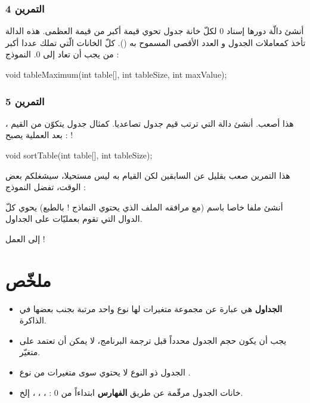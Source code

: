 \subsubsection{التمرين 4}
أنشئ دالّة
دورها إسناد 0 لكلّ خانة جدول تحوي قيمة أكبر من قيمة العظمى. هذه الدالة تأخذ كمعاملات الجدول و العدد الأقصى المسموح به
().
كلّ الخانات الّتي تملك عددا أكبر من
يجب أن تعاد إلى 0. النموذج :
\begin{Csource}
void tableMaximum(int table[], int tableSize, int maxValue);
\end{Csource}
\subsubsection{التمرين 5}
هذا أصعب. أنشئ دالة
التي ترتب قيم جدول تصاعديا. كمثال جدول يتكوّن من القيم
،
بعد العملية يصبح :
 !
\begin{Csource}
void sortTable(int table[], int tableSize);
\end{Csource}
هذا التمرين صعب بقليل عن السابقين لكن القيام به ليس مستحيلا، سيشغلكم بعض الوقت، تفضل النموذج :
\begin{information}
أنشئ ملفا خاصا باسم
(مع مرافقه الملف
الذي يحتوي النماذج ! بالطبع) يحوي كلّ الدوال التي تقوم بعمليّات على الجداول.
\end{information}
إلى العمل !

\section*{ملخّص}
\begin{itemize}
  \item \textbf{الجداول}
هي عبارة عن مجموعة متغيرات لها نوع واحد مرتبة بجنب بعضها في الذاكرة.
  \item يجب أن يكون حجم الجدول محدداً قبل ترجمة البرنامج، لا يمكن أن تعتمد على متغيّر.
  \item الجدول ذو النوع
لا يحتوي سوى متغيرات من نوع
.
  \item خانات الجدول مرقّمة عن طريق
\textbf{الفهارس}
ابتداءاً من 0 :
، ، ،
إلخ.
\end{itemize}
